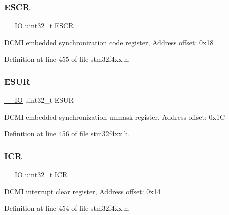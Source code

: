 \subsubsection{\texorpdfstring{E\+S\+CR}{ESCR}}
{\footnotesize\ttfamily \hyperlink{group___c_m_s_i_s__core__definitions_gaec43007d9998a0a0e01faede4133d6be}{\+\_\+\+\_\+\+IO} uint32\+\_\+t E\+S\+CR}

D\+C\+MI embedded synchronization code register, Address offset\+: 0x18 

Definition at line 455 of file stm32f4xx.\+h.

\mbox{\label{struct_d_c_m_i___type_def_af751d49ef824c1636c78822ecae066f4}} 
\subsubsection{\texorpdfstring{E\+S\+UR}{ESUR}}
{\footnotesize\ttfamily \hyperlink{group___c_m_s_i_s__core__definitions_gaec43007d9998a0a0e01faede4133d6be}{\+\_\+\+\_\+\+IO} uint32\+\_\+t E\+S\+UR}

D\+C\+MI embedded synchronization unmask register, Address offset\+: 0x1C 

Definition at line 456 of file stm32f4xx.\+h.

\mbox{\label{struct_d_c_m_i___type_def_a0a8c8230846fd8ff154b9fde8dfa0399}} 
\subsubsection{\texorpdfstring{I\+CR}{ICR}}
{\footnotesize\ttfamily \hyperlink{group___c_m_s_i_s__core__definitions_gaec43007d9998a0a0e01faede4133d6be}{\+\_\+\+\_\+\+IO} uint32\+\_\+t I\+CR}

D\+C\+MI interrupt clear register, Address offset\+: 0x14 

Definition at line 454 of file stm32f4xx.\+h.

\mbox{\label{struct_d_c_m_i___type_def_a6566f8cfbd1d8aa7e8db046aa35e77db}} 
